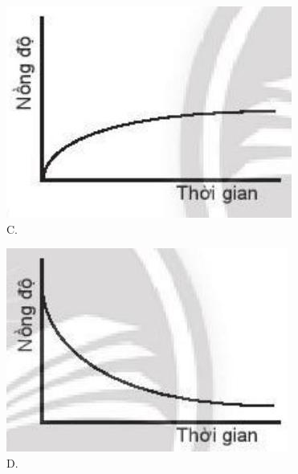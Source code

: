 \documentclass[10pt]{article}
\begin{document}
\begin{figure}[h]
\begin{center}
\captionsetup{labelformat=empty}
\caption{C.}
  \includegraphics[width=\textwidth]{2025_10_23_883c4b146e2332109fcdg-68}
\end{center}
\end{figure}

\begin{figure}[h]
\begin{center}
\captionsetup{labelformat=empty}
\caption{D.}
  \includegraphics[width=\textwidth]{2025_10_23_883c4b146e2332109fcdg-68(1)}
\end{center}
\end{figure}
\end{document}
